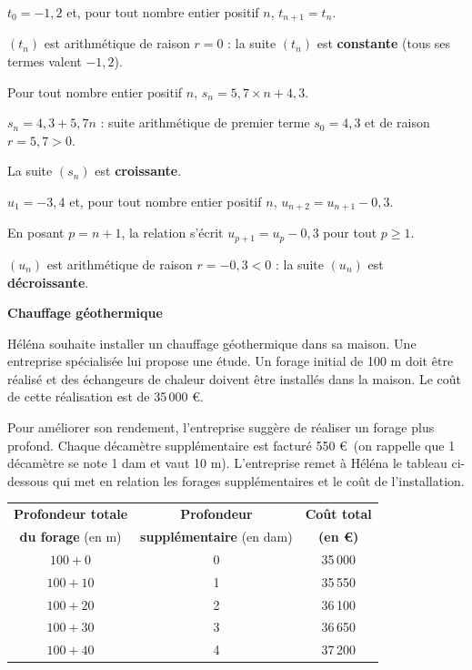 \documentclass[12pt,a4paper]{book}
\begin{document}
\begin{enumMet}
	\item $t_0=-1,2$ et, pour tout nombre entier positif $n$, $t_{n+1}=t_n$.

	\begin{corrBox}
		$(t_n)$ est arithmétique de raison $r=0$ : la suite $(t_n)$ est \textbf{constante} (tous ses termes valent $-1,2$).
	\end{corrBox}
	\item Pour tout nombre entier positif $n$, $s_n=5,7\times n+4,3$.

	\begin{corrBox}
		$s_n=4,3+5,7n$ : suite arithmétique de premier terme $s_0=4,3$ et de raison $r=5,7>0$.

		La suite $(s_n)$ est \textbf{croissante}.
	\end{corrBox}
	\item $u_1=-3,4$ et, pour tout nombre entier positif $n$, $u_{n+2}=u_{n+1}-0,3$.

	\begin{corrBox}
		En posant $p=n+1$, la relation s'écrit $u_{p+1}=u_p-0,3$ pour tout $p\geqslant 1$.

		$(u_n)$ est arithmétique de raison $r=-0,3<0$ : la suite $(u_n)$ est \textbf{décroissante}.
	\end{corrBox}
\end{enumMet}

\exerciceDS{} \textbf{Chauffage géothermique}

Héléna souhaite installer un chauffage géothermique dans sa maison. Une entreprise spécialisée lui propose une étude. Un forage initial de 100 m doit être réalisé et des échangeurs de chaleur doivent être installés dans la maison. Le coût de cette réalisation est de 35\,000 \euro.

Pour améliorer son rendement, l'entreprise suggère de réaliser un forage plus profond. Chaque décamètre supplémentaire est facturé 550 \euro\ (on rappelle que 1 décamètre se note 1 dam et vaut 10 m). L'entreprise remet à Héléna le tableau ci-dessous qui met en relation les forages supplémentaires et le coût de l'installation.

\begin{center}
\begin{tabular}{|c|c|c|}
	\hline
	\textbf{Profondeur totale} & \textbf{Profondeur} & \textbf{Coût total} \\
	\textbf{du forage} (en m) & \textbf{supplémentaire} (en dam) & \textbf{(en \euro)} \\
	\hline
	$100+0$ & 0 & 35\,000 \\
	\hline
	$100+10$ & 1 & 35\,550 \\
	\hline
	$100+20$ & 2 & 36\,100 \\
	\hline
	$100+30$ & 3 & 36\,650 \\
	\hline
	$100+40$ & 4 & 37\,200 \\
	\hline
\end{tabular}
\end{center}
\end{document}
